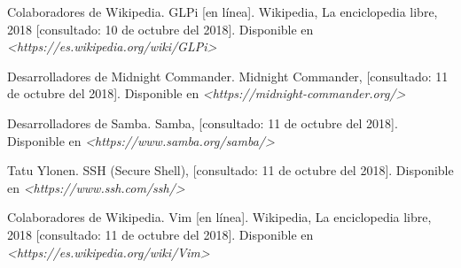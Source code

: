 \documentclass[12pt,a4paper]{article}
\begin{document}
\cleardoublepage
\begin{thebibliography}{9}
Colaboradores de Wikipedia. GLPi [en línea]. Wikipedia, La enciclopedia libre, 2018 [consultado: 10 de octubre del 2018]. Disponible en \textit{<https://es.wikipedia.org/wiki/GLPi>}

Desarrolladores de Midnight Commander. Midnight Commander, [consultado: 11 de octubre del 2018]. Disponible en \textit{<https://midnight-commander.org/>}  

Desarrolladores de Samba. Samba, [consultado: 11 de octubre del 2018]. Disponible en \textit{<https://www.samba.org/samba/>}  

Tatu Ylonen. SSH (Secure Shell), [consultado: 11 de octubre del 2018]. Disponible en \textit{<https://www.ssh.com/ssh/>}  

Colaboradores de Wikipedia. Vim [en línea]. Wikipedia, La enciclopedia libre, 2018 [consultado: 11 de octubre del 2018]. Disponible en \textit{<https://es.wikipedia.org/wiki/Vim>}
\end{thebibliography}
\end{document}
